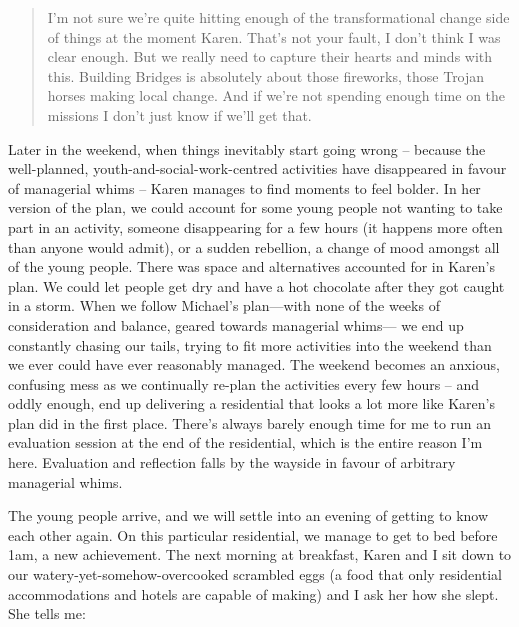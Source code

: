 \begin{quote}
I’m not sure we’re quite hitting enough of the transformational change side of things at the moment Karen. That’s not your fault, I don’t think I was clear enough. But we really need to capture their hearts and minds with this. Building Bridges is absolutely about those fireworks, those Trojan horses making local change. And if we’re not spending enough time on the missions I don’t just know if we’ll get that.
\end{quote}

Later in the weekend, when things inevitably start going wrong – because the well-planned, youth-and-social-work-centred activities have disappeared in favour of managerial whims – Karen manages to find moments to feel bolder. In her version of the plan, we could account for some young people not wanting to take part in an activity, someone disappearing for a few hours (it happens more often than anyone would admit), or a sudden rebellion, a change of mood amongst all of the young people. There was space and alternatives accounted for in Karen's plan. We could let people get dry and have a hot chocolate after they got caught in a storm. When we follow Michael’s plan—with none of the weeks of consideration and balance, geared towards managerial whims— we end up constantly chasing our tails, trying to fit more activities into the weekend than we ever could have ever reasonably managed. The weekend becomes an anxious, confusing mess as we continually re-plan the activities every few hours – and oddly enough, end up delivering a residential that looks a lot more like Karen’s plan did in the first place. There’s always barely enough time for me to run an evaluation session at the end of the residential, which is the entire reason I’m here. Evaluation and reflection falls by the wayside in favour of arbitrary managerial whims. 

The young people arrive, and we will settle into an evening of getting to know each other again. On this particular residential, we manage to get to bed before 1am, a new achievement. The next morning at breakfast, Karen and I sit down to our watery-yet-somehow-overcooked scrambled eggs (a food that only residential accommodations and hotels are capable of making) and I ask her how she slept. She tells me:

